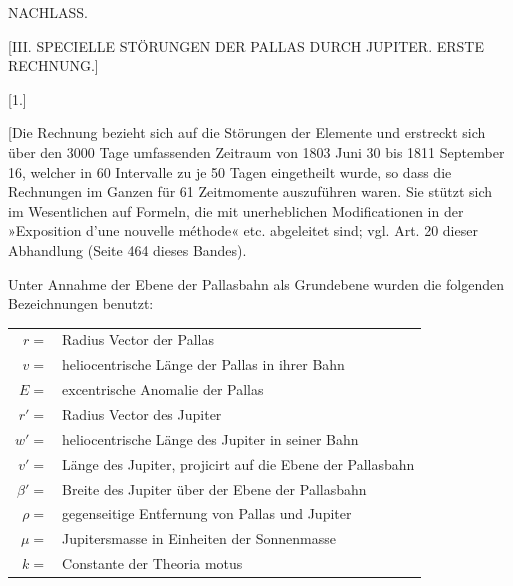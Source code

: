 \clearpage
{}
\begin{center}
{\Large NACHLASS.\par}
\bigskip
{\large [III. SPECIELLE STÖRUNGEN DER PALLAS DURCH JUPITER. ERSTE RECHNUNG.]\par}
\end{center}
\par{}\bigskip
{}
\begin{center}[1.]\end{center}
\begingroup
\makeatletter\tagsleft@true\let\veqno\@@leqno\makeatother
\setlength{\lineskip}{4pt}\setlength{\lineskiplimit}{4pt}
\noindent\hspace*{\parindent}[Die Rechnung bezieht sich auf die Störungen der Elemente und erstreckt sich über den 3000 Tage umfassenden Zeitraum von 1803 Juni 30 bis 1811 September 16, welcher in 60 Intervalle zu je 50 Tagen eingetheilt wurde, so dass die Rechnungen im Ganzen für 61 Zeitmomente auszuführen waren. Sie stützt sich im Wesentlichen auf Formeln, die mit unerheblichen Modificationen in der »Exposition d’une nouvelle méthode« etc. abgeleitet sind; vgl. Art. 20 dieser Abhandlung (Seite 464 dieses Bandes).
\par
Unter Annahme der Ebene der Pallasbahn als Grundebene wurden die folgenden Bezeichnungen benutzt:
\begin{center}
\begin{tabular}{@{}r@{\ }p{.86\linewidth}@{}}
\(r={}\)&Radius Vector der Pallas\\
\(v={}\)&heliocentrische Länge der Pallas in ihrer Bahn\\
\(E={}\)&excentrische Anomalie der Pallas\\
\(r'={}\)&Radius Vector des Jupiter\\
\(w'={}\)&heliocentrische Länge des Jupiter in seiner Bahn\\
\(v'={}\)&Länge des Jupiter, projicirt auf die Ebene der Pallasbahn\\
\(\beta'={}\)&Breite des Jupiter über der Ebene der Pallasbahn\\
\(\rho={}\)&gegenseitige Entfernung von Pallas und Jupiter\\
\(\mu={}\)&Jupitersmasse in Einheiten der Sonnenmasse\\
\(k={}\)&Constante der Theoria motus
\end{tabular}
\end{center}
